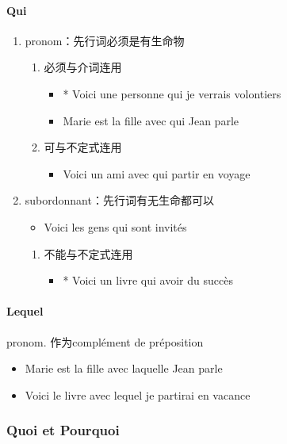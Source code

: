 \documentclass[UTF8]{report}
\begin{document}
\paragraph{Qui}
\begin{enumerate}
    \item pronom：先行词必须是有生命物
    \begin{enumerate}
        \item 必须与介词连用
        \begin{itemize}
            \item * Voici une personne qui je verrais volontiers
            \item Marie est la fille avec qui Jean parle
        \end{itemize}
        \item 可与不定式连用
        \begin{itemize}
            \item Voici un ami avec qui partir en voyage
        \end{itemize}
    \end{enumerate}
    \item subordonnant：先行词有无生命都可以
    \begin{itemize}
        \item Voici les gens qui sont invités
    \end{itemize}
    \begin{enumerate}
        \item 不能与不定式连用
        \begin{itemize}
            \item * Voici un livre qui avoir du succès
        \end{itemize}
    \end{enumerate}
\end{enumerate}

\paragraph{Lequel}
pronom. 作为complément de préposition
\begin{itemize}
    \item Marie est la fille avec laquelle Jean parle
    \item Voici le livre avec lequel je partirai en vacance
\end{itemize}


\subsubsection{Quoi et Pourquoi}
\end{document}

